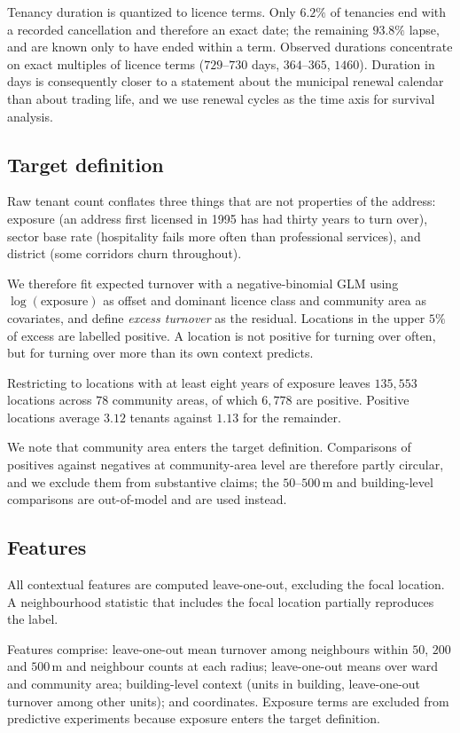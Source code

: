 \documentclass[11pt]{article}
\begin{document}
Tenancy duration is quantized to licence terms. Only $6.2\%$ of tenancies end
with a recorded cancellation and therefore an exact date; the remaining $93.8\%$
lapse, and are known only to have ended within a term. Observed durations
concentrate on exact multiples of licence terms ($729$--$730$ days,
$364$--$365$, $1460$). Duration in days is consequently closer to a statement
about the municipal renewal calendar than about trading life, and we use renewal
cycles as the time axis for survival analysis.

\subsection{Target definition}

Raw tenant count conflates three things that are not properties of the address:
exposure (an address first licensed in 1995 has had thirty years to turn over),
sector base rate (hospitality fails more often than professional services), and
district (some corridors churn throughout).

We therefore fit expected turnover with a negative-binomial GLM using
$\log(\text{exposure})$ as offset and dominant licence class and community area
as covariates, and define \emph{excess turnover} as the residual. Locations in
the upper $5\%$ of excess are labelled positive. A location is not positive for
turning over often, but for turning over more than its own context predicts.

Restricting to locations with at least eight years of exposure leaves
$135{,}553$ locations across $78$ community areas, of which $6{,}778$ are
positive. Positive locations average $3.12$ tenants against $1.13$ for the
remainder.

We note that community area enters the target definition. Comparisons of
positives against negatives at community-area level are therefore partly
circular, and we exclude them from substantive claims; the $50$--$500$\,m and
building-level comparisons are out-of-model and are used instead.

\subsection{Features}

All contextual features are computed leave-one-out, excluding the focal
location. A neighbourhood statistic that includes the focal location partially
reproduces the label.

Features comprise: leave-one-out mean turnover among neighbours within $50$,
$200$ and $500$\,m and neighbour counts at each radius; leave-one-out means over
ward and community area; building-level context (units in building, leave-one-out
turnover among other units); and coordinates. Exposure terms are excluded from
predictive experiments because exposure enters the target definition.
\end{document}
